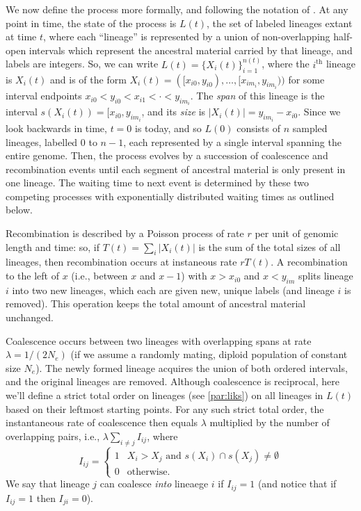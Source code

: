 \documentclass{article}
\begin{document}
We now define the process more formally,
and following the notation of \citet{mcvean_approximating_2005}.
At any point in time, the state of the process is $L(t)$,
the set of labeled lineages extant at time $t$,
where each ``lineage'' is represented by a union of non-overlapping half-open intervals
which represent the ancestral material carried by that lineage,
and labels are integers.
So, we can write $L(t) = \{X_i(t)\}_{i=1}^{n(t)}$,
where the $i^\text{th}$ lineage is $X_i(t)$
and is of the form
$X_i(t) = ([x_{i0}, y_{i0}), \dotsc, [x_{im_i}, y_{im_i}))$
for some interval endpoints $x_{i0} < y_{i0} < x_{i1} < \cdot < y_{im_i}$.
The \emph{span} of this lineage is the interval $s(X_i(t)) = [x_{i0}, y_{im_i}$,
and its \emph{size} is $|X_i(t)| = y_{im_i} - x_{i0}$.
Since we look backwards in time, $t=0$ is today, and so
$L(0)$ consists of $n$ sampled lineages, labelled $0$ to $n-1$,
each represented by a single interval spanning the entire genome.
Then, the process evolves by a succession of coalescence and recombination
events until each segment of ancestral material is only present in one lineage.
The waiting time to next event is determined by these two competing processes
with exponentially distributed waiting times as outlined below.

Recombination is described by a Poisson process of rate $r$ per unit of genomic length and time:
so, if $T(t) = \sum_i |X_i(t)|$ is the sum of the total sizes of all lineages,
then recombination occurs at instaneous rate $rT(t)$.
A recombination to the left of $x$
(i.e., between $x$ and $x-1$)
with $x>x_{i0}$ and $x<y_{im}$ splits lineage $i$ into two new lineages,
which each are given new, unique labels
(and lineage $i$ is removed).
This operation keeps the total amount of ancestral material unchanged.

Coalescence occurs between
two lineages with overlapping spans at rate $\lambda = 1/(2N_e)$
(if we assume a randomly mating, diploid population of constant size $N_e$).
The newly formed lineage acquires the union of both ordered intervals, %
and the original lineages are removed.
Although coalescence is reciprocal, here we'll define a strict total order on lineages
(see \ref{par:liks}) on all lineages in $L(t)$ based on their leftmost starting points.
For any such strict total order,
the instantaneous rate of coalescence then equals $\lambda$ multiplied by the number of overlapping pairs,
i.e., $\lambda \sum_{i \neq j} I_{ij}$,
where
\begin{equation} \label{def:coal}
I_{ij} = \begin{cases}
    1 & X_i > X_j \text{ and } s(X_i) \cap s(X_j) \neq \emptyset \\
    0 & \text{otherwise.}
\end{cases}
\end{equation}
We say that lineage $j$ can coalesce \emph{into} lineaege $i$ if $I_{ij} = 1$
(and notice that if $I_{ij} = 1$ then $I_{ji} = 0$).
\end{document}

